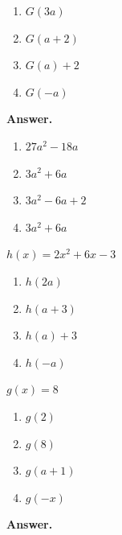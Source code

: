 \documentclass[10pt,]{book}
\theoremstyle{plain}
\theoremstyle{definition}
\theoremstyle{definition}
\theoremstyle{definition}
\theoremstyle{definition}
\numberwithin{equation}{part}
\begin{document}
\begin{exerciselist}
\begin{exercisegroup}
\begin{multicols}{2}
\begin{enumerate}[label=\alph*]
\item\hypertarget{li-502}{}\(G(3a)\)%
\item\hypertarget{li-503}{}\(G(a + 2)\)%
\item\hypertarget{li-504}{}\(G(a) + 2\)%
\item\hypertarget{li-505}{}\(G(-a)\)%
\end{enumerate}
\end{multicols}
%
\par\smallskip
\noindent\textbf{Answer.}\hypertarget{answer-73}{}\quad
\leavevmode%
\begin{multicols}{2}
\begin{enumerate}[label=\alph*]
\item\hypertarget{li-506}{}\(27a^2 - 18a\)%
\item\hypertarget{li-507}{}\(3a^2 + 6a\)%
\item\hypertarget{li-508}{}\(3a^2 - 6a + 2\)%
\item\hypertarget{li-509}{}\(3a^2 + 6a \)%
\end{enumerate}
\end{multicols}
%
\exercise[60.]\hypertarget{exercise-129}{}\(h(x) = 2x^2 + 6x - 3\) \leavevmode%
\begin{multicols}{2}
\begin{enumerate}[label=\alph*]
\item\hypertarget{li-510}{}\(h(2a)\)%
\item\hypertarget{li-511}{}\(h(a + 3)\)%
\item\hypertarget{li-512}{}\(h(a) + 3\)%
\item\hypertarget{li-513}{}\(h(-a)\)%
\end{enumerate}
\end{multicols}
%
\exercise[61.]\hypertarget{exercise-130}{}\(g(x) = 8\) \leavevmode%
\begin{multicols}{2}
\begin{enumerate}[label=\alph*]
\item\hypertarget{li-514}{}\(g(2)\)%
\item\hypertarget{li-515}{}\(g(8)\)%
\item\hypertarget{li-516}{}\(g(a + 1)\)%
\item\hypertarget{li-517}{}\(g(-x)\)%
\end{enumerate}
\end{multicols}
%
\par\smallskip
\noindent\textbf{Answer.}\hypertarget{answer-74}{}\quad
\leavevmode%
\begin{multicols}{2}
\begin{enumerate}[label=\alph*]

\end{enumerate}
\end{multicols}
\end{exercisegroup}
\end{exerciselist}
\end{document}
